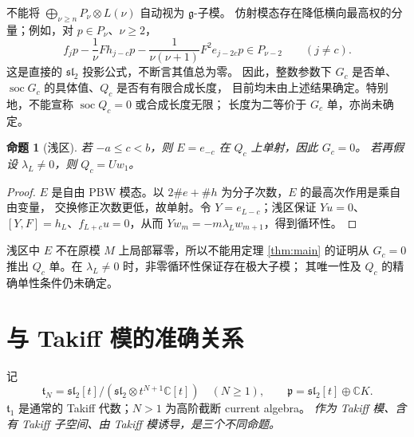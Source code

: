 \documentclass[UTF8,11pt,a4paper,fontset=fandol]{ctexart}
\theoremstyle{upright}
\newtheorem{proposition}[theorem]{命题}
\newcommand{\C}{\mathbb C}
\newcommand{\g}{\mathfrak g}
\newcommand{\p}{\mathfrak p}
\newcommand{\slc}{\mathfrak{sl}_2}
\DeclareMathOperator{\soc}{soc}
\begin{document}
不能将 $\bigoplus_{\nu\ge n}P_\nu\otimes L(\nu)$ 自动视为 $\g$-子模。
仿射模态存在降低横向最高权的分量；例如，对 $p\in P_\nu$、$\nu\ge2$，
\[
f_jp-\frac1\nu Fh_{j-c}p
-\frac1{\nu(\nu+1)}F^2e_{j-2c}p\in P_{\nu-2}
\qquad(j\ne c).
\]
这是直接的 $\slc$ 投影公式，不断言其值总为零。
因此，整数参数下 $G_c$ 是否单、$\soc G_c$ 的具体值、$Q_c$ 是否有有限合成长度，
目前均未由上述结果确定。特别地，不能宣称 $\soc Q_c=0$ 或合成长度无限；
长度为二等价于 $G_c$ 单，亦尚未确定。

\begin{proposition}[浅区]\label{prop:shallow}
若 $-a\le c<b$，则 $E=e_{-c}$ 在 $Q_c$ 上单射，因此 $G_c=0$。
若再假设 $\lambda_L\ne0$，则 $Q_c=Uw_1$。
\end{proposition}
\begin{proof}
$E$ 是自由 PBW 模态。以 $2\#e+\#h$ 为分子次数，$E$ 的最高次作用是乘自由变量，
交换修正次数更低，故单射。令 $Y=e_{L-c}$；浅区保证 $Yu=0$、
$[Y,F]=h_L$、$f_{L+c}u=0$，从而 $Yw_m=-m\lambda_Lw_{m+1}$，得到循环性。
\end{proof}

浅区中 $E$ 不在原模 $M$ 上局部幂零，所以不能用定理 \ref{thm:main} 的证明从 $G_c=0$
推出 $Q_c$ 单。在 $\lambda_L\ne0$ 时，非零循环性保证存在极大子模；
其唯一性及 $Q_c$ 的精确单性条件仍未确定。

\section{与 Takiff 模的准确关系}

记
\[
\mathfrak t_N=\slc[t]/(\slc\otimes t^{N+1}\C[t])\quad(N\ge1),
\qquad \p=\slc[t]\oplus\C K.
\]
$\mathfrak t_1$ 是通常的 Takiff 代数；$N>1$ 为高阶截断 current algebra。
\emph{作为 Takiff 模、含有 Takiff 子空间、由 Takiff 模诱导，是三个不同命题。}
\end{document}
